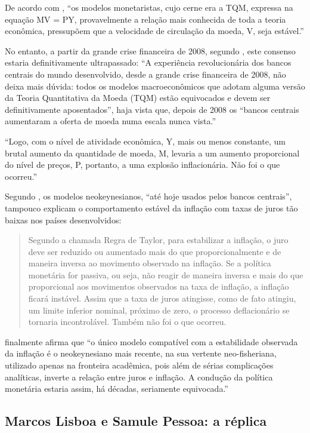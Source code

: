\documentclass[]{article}
\begin{document}
De acordo com , ``os modelos monetaristas,
cujo cerne era a TQM, expressa na equação MV = PY, provavelmente a
relação mais conhecida de toda a teoria econômica, pressupõem que a
velocidade de circulação da moeda, V, seja estável.''

No entanto, a partir da grande crise financeira de 2008, segundo
, este consenso estaria definitivamente
ultrapassado: ``A experiência revolucionária dos bancos centrais do
mundo desenvolvido, desde a grande crise financeira de 2008, não deixa
mais dúvida: todos os modelos macroeconômicos que adotam alguma versão
da Teoria Quantitativa da Moeda (TQM) estão equivocados e devem ser
definitivamente aposentados'', haja vista que, depois de 2008 os
``bancos centrais aumentaram a oferta de moeda numa escala nunca
vista.''

``Logo, com o nível de atividade econômica, Y, mais ou menos constante,
um brutal aumento da quantidade de moeda, M, levaria a um aumento
proporcional do nível de preços, P, portanto, a uma explosão
inflacionária. Não foi o que ocorreu.''

Segundo , os modelos neokeynesianos, ``até
hoje usados pelos bancos centrais'', tampouco explicam o comportamento
estável da inflação com taxas de juros tão baixas nos países
desenvolvidos:

\begin{quote}
Segundo a chamada Regra de Taylor, para estabilizar a inflação, o juro
deve ser reduzido ou aumentado mais do que proporcionalmente e de
maneira inversa ao movimento observado na inflação. Se a política
monetária for passiva, ou seja, não reagir de maneira inversa e mais do
que proporcional aos movimentos observados na taxa de inflação, a
inflação ficará instável. Assim que a taxa de juros atingisse, como de
fato atingiu, um limite inferior nominal, próximo de zero, o processo
deflacionário se tornaria incontrolável. Também não foi o que ocorreu.
\end{quote}

 finalmente afirma que ``o único modelo
compatível com a estabilidade observada da inflação é o neokeynesiano
mais recente, na sua vertente neo-fisheriana, utilizado apenas na
fronteira acadêmica, pois além de sérias complicações analíticas,
inverte a relação entre juros e inflação. A condução da política
monetária estaria assim, há décadas, seriamente equivocada.''

\subsection{Marcos Lisboa e Samule Pessoa: a
réplica}\label{marcos-lisboa-e-samule-pessoa-a-replica}
\end{document}
